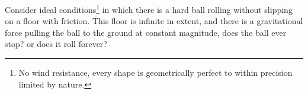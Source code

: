 Consider ideal conditions\footnote{No wind resistance, every shape is geometrically perfect to within precision limited by nature.} in which there is a hard ball rolling without slipping on a floor with friction. This floor is infinite in extent, and there is a gravitational force pulling the ball to the ground at constant magnitude, does the ball ever stop? or does it roll forever?